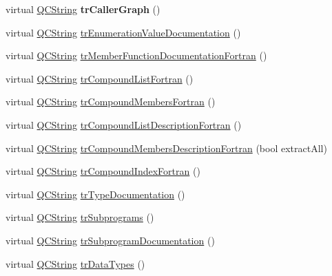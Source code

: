 \begin{DoxyCompactItemize}
\mbox{\label{class_translator_slovak_a428ca5c89b1394c8a03e21b5897be34f}} 
virtual \mbox{\hyperlink{class_q_c_string}{Q\+C\+String}} {\bfseries tr\+Caller\+Graph} ()
\item 
virtual \mbox{\hyperlink{class_q_c_string}{Q\+C\+String}} \mbox{\hyperlink{class_translator_slovak_a21fc43eb3598f02b0e9125ddbe8f72d8}{tr\+Enumeration\+Value\+Documentation}} ()
\item 
virtual \mbox{\hyperlink{class_q_c_string}{Q\+C\+String}} \mbox{\hyperlink{class_translator_slovak_a1a0bf2a9edb72edfd79a3ea62fe63207}{tr\+Member\+Function\+Documentation\+Fortran}} ()
\item 
virtual \mbox{\hyperlink{class_q_c_string}{Q\+C\+String}} \mbox{\hyperlink{class_translator_slovak_a3d7a9ccb7bc9541dbcca0a79caf75764}{tr\+Compound\+List\+Fortran}} ()
\item 
virtual \mbox{\hyperlink{class_q_c_string}{Q\+C\+String}} \mbox{\hyperlink{class_translator_slovak_a7d75173be00da349fec8c59a68ddf32e}{tr\+Compound\+Members\+Fortran}} ()
\item 
virtual \mbox{\hyperlink{class_q_c_string}{Q\+C\+String}} \mbox{\hyperlink{class_translator_slovak_a87f692279b18ee08455fd49ea6b87c26}{tr\+Compound\+List\+Description\+Fortran}} ()
\item 
virtual \mbox{\hyperlink{class_q_c_string}{Q\+C\+String}} \mbox{\hyperlink{class_translator_slovak_a58b1430d35000fa15e83513bba79aece}{tr\+Compound\+Members\+Description\+Fortran}} (bool extract\+All)
\item 
virtual \mbox{\hyperlink{class_q_c_string}{Q\+C\+String}} \mbox{\hyperlink{class_translator_slovak_abd3f486285cbb1f20d1f7d93b91ba896}{tr\+Compound\+Index\+Fortran}} ()
\item 
virtual \mbox{\hyperlink{class_q_c_string}{Q\+C\+String}} \mbox{\hyperlink{class_translator_slovak_abfb8e71379d3ce51e35cb6105ece66f5}{tr\+Type\+Documentation}} ()
\item 
virtual \mbox{\hyperlink{class_q_c_string}{Q\+C\+String}} \mbox{\hyperlink{class_translator_slovak_ae40bb30c036c148d433580c8bf6d92fa}{tr\+Subprograms}} ()
\item 
virtual \mbox{\hyperlink{class_q_c_string}{Q\+C\+String}} \mbox{\hyperlink{class_translator_slovak_a9567a547a695495acf1a28b7a4947495}{tr\+Subprogram\+Documentation}} ()
\item 
virtual \mbox{\hyperlink{class_q_c_string}{Q\+C\+String}} \mbox{\hyperlink{class_translator_slovak_a1fb2ce2c34dafe725c49f64870175f9c}{tr\+Data\+Types}} ()

\end{DoxyCompactItemize}

